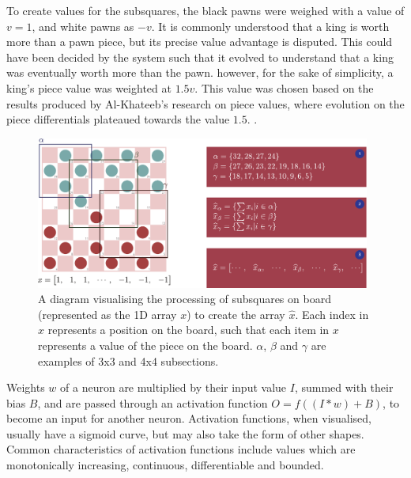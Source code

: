 \documentclass[12pt,a4paper]{article}
\begin{document}
        To create values for the subsquares, the black pawns were weighed with a value of $v=1$, and white pawns as $-v$. It is commonly understood that a king is worth more than a pawn piece, but its precise value advantage is disputed. This could have been decided by the system such that it evolved to understand that a king was eventually worth more than the pawn. however, for the sake of simplicity, a king's piece value was weighted at $1.5v$. This value was chosen based on the results produced by Al-Khateeb's research on piece values, where evolution on the piece differentials plateaued towards the value $1.5$. \cite{al-khateeb_importance_2010}.

        \begin{figure}[!ht]
            \centering
            \includegraphics[width=110mm]{images/subsquares.pdf}
            \caption{A diagram visualising the processing of subsquares on board (represented as the 1D array $x$) to create the array $\widehat{x}$. Each index in $x$ represents a position on the board, such that each item in $x$ represents a value of the piece on the board. $\alpha$, $\beta$ and $\gamma$ are examples of 3x3 and 4x4 subsections. \label{subsquares}}
        \end{figure}

        Weights $w$ of a neuron are multiplied by their input value $I$, summed with their bias $B$, and are passed through an activation function $O = f((I* w) + B)$, to become an input for another neuron. Activation functions, when visualised, usually have a sigmoid curve, but may also take the form of other shapes. Common characteristics of activation functions include values which are monotonically increasing, continuous, differentiable and bounded. 
\end{document}
